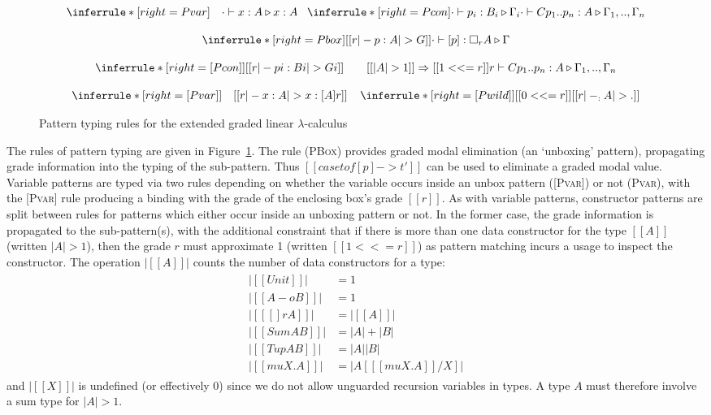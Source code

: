 \begin{figure}[t]
\begin{align*}
\setlength{\arraycolsep}{0em}
\begin{array}{ccc}
\inferrule*[right=Pvar]
 {\quad}
 {\cdot \vdash x : A \triangleright x : A}
\;\;\;
\inferrule*[right=Pcon]
{\cdot \vdash p_i : B_i \triangleright \Gamma_i}
{\cdot \vdash C p_1 .. p_n : A \triangleright \Gamma_1, .., \Gamma_n}
\\[1.25em]
\inferrule*[right={Pbox}]
{[[ r |- p : A |> G ]]}
{\cdot \vdash [p] : \Box_r A \triangleright \Gamma }
 \\[1.25em]
\inferrule*[right={[}Pcon{]}]
{[[ r |- pi : Bi |> Gi ]] \quad\quad
[[ |A| > 1 ]] \Rightarrow [[ 1 <<= r ]]}
{r \vdash C p_1 .. p_n : A \triangleright \Gamma_1, .., \Gamma_n}
%
\\[1.25em]
\inferrule*[right={[}Pvar{]}]
 {\quad}
 {[[ r |- x : A |> x : [ A ] { r } ]]}
 \;\;\;\;
\inferrule*[right={[}Pwild{]}]
 {[[ 0 <<= r ]]}
 {[[ r |- _ : A |> . ]]}
\end{array}
\end{align*}
\caption{Pattern typing rules for the extended graded linear $\lambda$-calculus}
\label{fig:deriving-pattern-rules}
\end{figure}

The rules of pattern typing are given in
Figure~\ref{fig:deriving-pattern-rules}.
The rule (\textsc{PBox}) provides
graded modal elimination (an `unboxing' pattern),
propagating grade information into the typing of the
sub-pattern. Thus $[[ case t of [p] -> t' ]]$ can be used to eliminate
a graded modal value. Variable patterns are typed via two
rules depending on whether the variable occurs inside an unbox pattern
(\textsc{[Pvar]}) or not (\textsc{Pvar}),
with the \textsc{[Pvar]} rule producing a binding with the grade of
the enclosing box’s grade $[[ r ]]$.
As with variable patterns, constructor patterns are split
between rules for patterns which either occur inside an unboxing
pattern or not. In the former case, the grade information is
propagated to the sub-pattern(s), with the additional constraint that
if there is more than one data constructor for the type $[[ A ]]$ (written
$|A| > 1$), then the grade $r$ must approximate 1 (written $[[ 1 <<= r
]]$) as pattern matching
incurs a usage to inspect the constructor. The
operation $|[[ A ]]|$ counts the number of data constructors
for a type:
%
\begin{align*}
  \begin{array}{ll}
|[[ Unit ]]| &= 1 \\
|[[ A -o B ]]| &= 1 \\
|[[ [] r A ]]| &= |[[  A ]]| \\
|[[ Sum A B ]]| &= |A| + |B| \\
|[[ Tup A B ]]| &= |A| |B| \\
|[[ mu X . A ]]| &= |A [ [[ mu X . A ]] / X ]|
  \end{array}
\end{align*}
%
and $|[[ X ]]|$ is undefined (or effectively 0) since we do not
allow unguarded recursion variables in types.
A type $A$ must therefore involve a sum type for $|A| > 1$.

